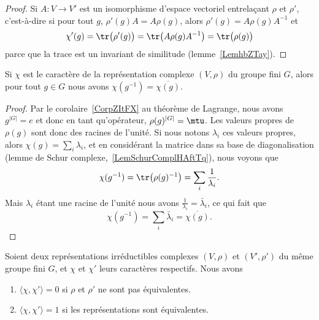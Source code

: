 \begin{proof}
    Si \( A\colon V\to V'\) est un isomorphisme d'espace vectoriel entrelaçant \( \rho\) et \( \rho'\), c'est-à-dire si pour tout \( g\), \( \rho'(g)A=A\rho(g)\), alors \( \rho'(g)=A\rho(g)A^{-1}\) et
    \begin{equation}
        \chi'(g)=\tr\big( \rho'(g) \big)=\tr\big( A\rho(g)A^{-1} \big)=\tr\big( \rho(g) \big)
    \end{equation}
    parce que la trace est un invariant de similitude (lemme~\ref{LemhbZTay}).
\end{proof}

\begin{lemma}   \label{LemJqIZns}
    Si \( \chi\) est le caractère de la représentation complexe \( (V,\rho)\) du groupe fini \( G\), alors pour tout \( g\in G\) nous avons \( \chi(g^{-1})=\overline{ \chi(g) }\).
\end{lemma}

\begin{proof}
    Par le corolaire~\ref{CorpZItFX} au théorème de Lagrange, nous avons \( g^{| G |}=e\) et donc en tant qu'opérateur, \( \rho(g)^{| G |}=\mtu\). Les valeurs propres de \( \rho(g)\) sont donc des racines de l'unité. Si nous notons \( \lambda_i\) ces valeurs propres, alors \( \chi(g)=\sum_i\lambda_i\), et en considérant la matrice dans sa base de diagonalisation (lemme de Schur complexe,~\ref{LemSchurComplHAftTq}), nous voyons que
    \begin{equation}
        \chi(g^{-1})=\tr\big( \rho(g)^{-1} \big)=\sum_i\frac{1}{ \lambda_i }.
    \end{equation}
    Mais \( \lambda_i\) étant une racine de l'unité nous avons \( \frac{1}{ \lambda_i }=\bar\lambda_i\), ce qui fait que
    \begin{equation}
        \chi(g^{-1})=\sum_i\bar\lambda_i=\overline{ \chi(g) }.
    \end{equation}
\end{proof}

\begin{proposition} \label{PropJzbfWi}
    Soient deux représentations irréductibles complexes \( (V,\rho)\) et \( (V',\rho')\) du même groupe fini \( G\), et \( \chi\) et \( \chi'\) leurs caractères respectifs. Nous avons
    \begin{enumerate}
        \item
            \( \langle \chi, \chi'\rangle =0\) si \( \rho\) et \( \rho'\) ne sont pas équivalentes.
        \item
            \( \langle \chi, \chi'\rangle =1\) si les représentations sont équivalentes.
    \end{enumerate}
\end{proposition}

